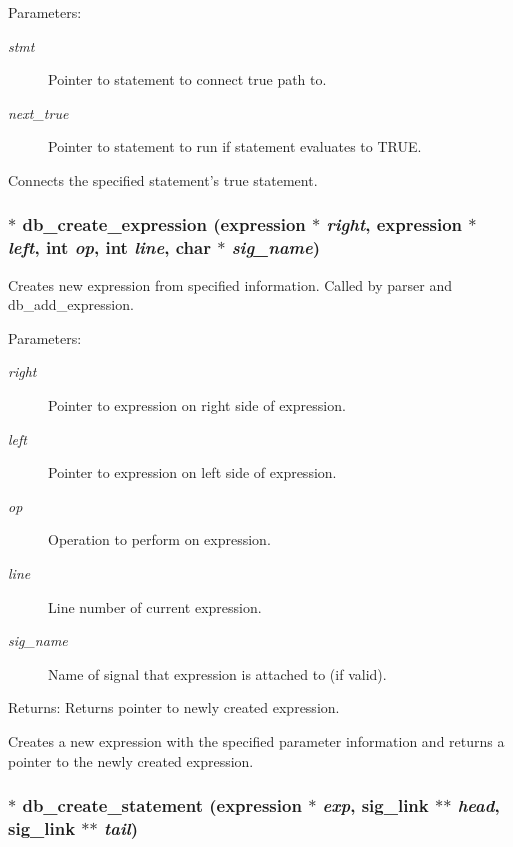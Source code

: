\begin{Desc}
\item[Parameters:]
\begin{description}
\item[{\em stmt}]Pointer to statement to connect true path to. \item[{\em next\_\-true}]Pointer to statement to run if statement evaluates to TRUE.\end{description}
\end{Desc}
Connects the specified statement's true statement. 
\subsubsection{$\ast$ db\_\-create\_\-expression ({\bf expression} $\ast$ {\em right}, {\bf expression} $\ast$ {\em left}, int {\em op}, int {\em line}, char $\ast$ {\em sig\_\-name})}\label{db_8h_a11}


Creates new expression from specified information. Called by parser and db\_\-add\_\-expression. 

\begin{Desc}
\item[Parameters:]
\begin{description}
\item[{\em right}]Pointer to expression on right side of expression. \item[{\em left}]Pointer to expression on left side of expression. \item[{\em op}]Operation to perform on expression. \item[{\em line}]Line number of current expression. \item[{\em sig\_\-name}]Name of signal that expression is attached to (if valid).\end{description}
\end{Desc}
\begin{Desc}
\item[Returns:]Returns pointer to newly created expression.\end{Desc}
Creates a new expression with the specified parameter information and returns a pointer to the newly created expression. 
\subsubsection{$\ast$ db\_\-create\_\-statement ({\bf expression} $\ast$ {\em exp}, {\bf sig\_\-link} $\ast$$\ast$ {\em head}, {\bf sig\_\-link} $\ast$$\ast$ {\em tail})}\label{db_8h_a13}


